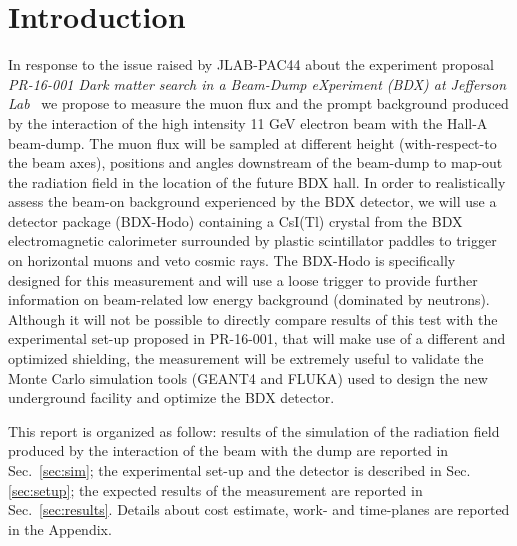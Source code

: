 \documentclass[letterpaper]{article}
\begin{document}
\newpage
\tableofcontents
\newpage



\section{Introduction}
In response to the issue raised by JLAB-PAC44  about the experiment proposal  {\it PR-16-001 Dark matter search in a Beam-Dump eXperiment (BDX) at Jefferson Lab}~\cite{bdx-proposal} we propose to measure  the muon flux and the prompt  background  produced by the interaction of the high intensity 11 GeV electron beam with the Hall-A beam-dump. The muon   flux will be sampled at different height (with-respect-to the beam axes), positions  and angles downstream of the beam-dump to map-out the radiation field in the location of the  future BDX hall.
In order to realistically assess the beam-on background experienced by the BDX detector, we will use a detector package (BDX-Hodo) containing a CsI(Tl) crystal from the  BDX electromagnetic calorimeter
surrounded by plastic scintillator paddles to trigger on horizontal muons and veto cosmic rays. The BDX-Hodo is specifically designed for this measurement and will use a  loose trigger to provide further information on 
beam-related  low energy background  (dominated by neutrons).
Although it will not be possible to directly compare results of this test with the experimental set-up proposed in PR-16-001, that will make use of a different and  optimized shielding, the measurement will be extremely useful to validate the Monte Carlo simulation tools (GEANT4 and FLUKA) used to design the new underground facility and optimize the BDX detector.

This report is organized as follow: 
results of the simulation of the radiation field produced by the interaction of the beam with the dump  are reported in Sec.~\ref{sec:sim}; the experimental set-up and the detector is described in Sec.\ref{sec:setup}; the expected results of the measurement are reported in Sec.~\ref{sec:results}. Details about cost estimate, work- and time-planes are reported in the Appendix.


\clearpage

\clearpage

\clearpage

\clearpage
\clearpage

\newpage

                                                                              

\end{document}
